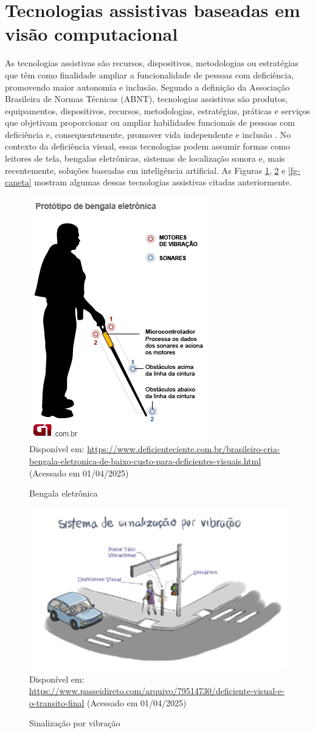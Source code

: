 \section{Tecnologias assistivas baseadas em visão computacional}
As tecnologias assistivas são recursos, dispositivos, metodologias ou estratégias que têm como finalidade ampliar a funcionalidade de pessoas com deficiência, promovendo maior autonomia e inclusão. Segundo a definição da Associação Brasileira de Normas Técnicas (ABNT), tecnologias assistivas são produtos, equipamentos, dispositivos, recursos, metodologias, estratégias, práticas e serviços que objetivam proporcionar ou ampliar habilidades funcionais de pessoas com deficiência e, consequentemente, promover vida independente e inclusão \cite{ABNT2004}. No contexto da deficiência visual, essas tecnologias podem assumir formas como leitores de tela, bengalas eletrônicas, sistemas de localização sonora e, mais recentemente, soluções baseadas em inteligência artificial. As Figuras \ref{fg-bengala}, \ref{fg-sinal} e \ref{fg-caneta} mostram algumas dessas tecnologias assistivas citadas anteriormente.
\begin{figure}[htbp]
  \centering
  \caption{Bengala eletrônica}
  \includegraphics[width=0.4 \textwidth]{Figuras/bengala2.jpg}
  \\
  Disponível em: \url{https://www.deficienteciente.com.br/brasileiro-cria-bengala-eletronica-de-baixo-custo-para-deficientes-visuais.html} (Acessado em 01/04/2025)
  \label{fg-bengala}
\end{figure}

\begin{figure}[htbp]
  \centering
  \caption{Sinalização por vibração}
  \includegraphics[width=0.6 \textwidth]{Figuras/sinal-vibra.png}
  \\
  Disponível em: \url{https://www.passeidireto.com/arquivo/79514730/deficiente-visual-e-o-transito-final} (Acessado em 01/04/2025)
  \label{fg-sinal}
\end{figure}

